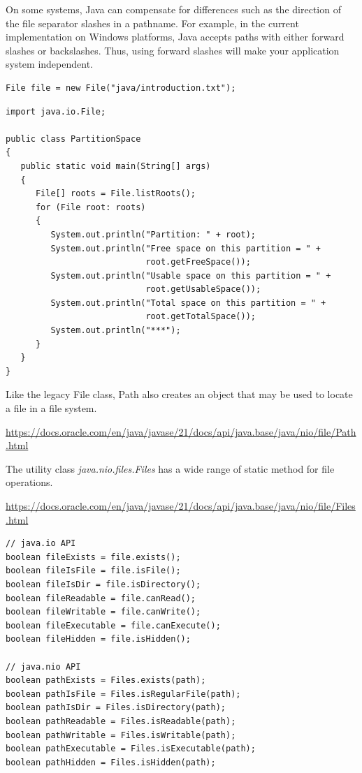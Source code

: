 On some systems,  Java can compensate for differences such as the direction of the file separator slashes in a pathname.  For example,  in the current implementation on Windows platforms,  Java accepts paths with either forward slashes or backslashes.
Thus, using forward slashes will make your application system independent.

\begin{lstlisting}
File file = new File("java/introduction.txt");
\end{lstlisting}


\begin{lstlisting}
import java.io.File;

public class PartitionSpace
{
   public static void main(String[] args)
   {
      File[] roots = File.listRoots();
      for (File root: roots)
      {
         System.out.println("Partition: " + root);
         System.out.println("Free space on this partition = " +
                            root.getFreeSpace());
         System.out.println("Usable space on this partition = " +
                            root.getUsableSpace());
         System.out.println("Total space on this partition = " +
                            root.getTotalSpace());
         System.out.println("***");
      }
   }
}
\end{lstlisting}


Like the legacy File class, Path also creates an object that may be used to locate a file in a file system.

\begin{thm}
        \url{https://docs.oracle.com/en/java/javase/21/docs/api/java.base/java/nio/file/Path.html}
    \end{thm}
    
    
The utility class \textit{java.nio.files.Files} has a wide range of static method for file operations. 

\begin{thm}
        \url{https://docs.oracle.com/en/java/javase/21/docs/api/java.base/java/nio/file/Files.html}
    \end{thm}


\begin{lstlisting}
// java.io API
boolean fileExists = file.exists();
boolean fileIsFile = file.isFile();
boolean fileIsDir = file.isDirectory();
boolean fileReadable = file.canRead();
boolean fileWritable = file.canWrite();
boolean fileExecutable = file.canExecute();
boolean fileHidden = file.isHidden();

// java.nio API
boolean pathExists = Files.exists(path);
boolean pathIsFile = Files.isRegularFile(path);
boolean pathIsDir = Files.isDirectory(path);
boolean pathReadable = Files.isReadable(path);
boolean pathWritable = Files.isWritable(path);
boolean pathExecutable = Files.isExecutable(path);
boolean pathHidden = Files.isHidden(path);
\end{lstlisting}

